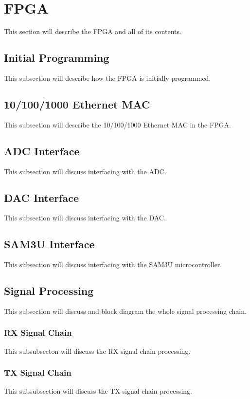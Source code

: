 \section{FPGA} %
\label{sec:fpga}
    This section will describe the FPGA and all of its contents.
    
    \subsection{Initial Programming} %
        \label{sub:initial_programming}
        This subsection will describe how the FPGA is initially programmed.
    
    \subsection{10/100/1000 Ethernet MAC} %
        This subsection will describe the 10/100/1000 Ethernet MAC in the FPGA.
        
    \subsection{ADC Interface} %
        This subsection will discuss interfacing with the ADC.
    
    \subsection{DAC Interface} %
        This subsection will discuss interfacing with the DAC.
        
    \subsection{SAM3U Interface} %
        This subsection will discuss interfacing with the SAM3U microcontroller.
        
    \subsection{Signal Processing} %
        This subsection will discuss and block diagram the whole signal processing
        chain.
        
        \subsubsection{RX Signal Chain} %
            This subsubsecton will discuss the RX signal chain processing.
        
        \subsubsection{TX Signal Chain} %
            This subsubsection will discuss the TX signal chain processing.
